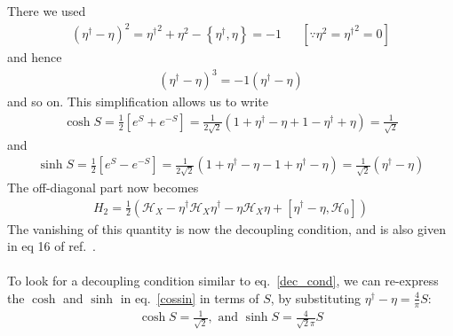\documentclass[twoside,11pt]{report}
\numberwithin{equation}{section}
\begin{document}
There we used
\begin{equation}\begin{aligned}
	\left(\eta^\dagger - \eta\right)^2 = {\eta^\dagger}^2 + \eta^2 - \left\{\eta^\dagger,\eta\right\} = -1 &&\left[\because\eta^2 = {\eta^\dagger}^2=0\right]
\end{aligned}\end{equation}
and hence
\begin{equation}\begin{aligned}
	\left(\eta^\dagger - \eta\right)^3 = -1\left(\eta^\dagger - \eta\right)
\end{aligned}\end{equation}
and so on. This simplification allows us to write
\begin{equation}\begin{aligned}
	\label{cossin}
	\cosh S = \frac{1}{2}\left[e^S + e^{-S}\right] = \frac{1}{2\sqrt 2}\left(1 + \eta^\dagger - \eta + 1 - \eta^\dagger + \eta\right) = \frac{1}{\sqrt 2}
\end{aligned}\end{equation}
and
\begin{equation}\begin{aligned}
	\sinh S = \frac{1}{2}\left[e^S - e^{-S}\right] = \frac{1}{2\sqrt 2}\left(1 + \eta^\dagger - \eta - 1 + \eta^\dagger - \eta\right) = \frac{1}{\sqrt 2}\left(\eta^\dagger - \eta\right)
\end{aligned}\end{equation}
The off-diagonal part now becomes
\begin{equation}\begin{aligned}
	H_2 = \frac{1}{2}\left(\mathcal{H}_X - \eta^\dagger \mathcal{H}_X \eta^\dagger - \eta \mathcal{H}_X \eta + \left[\eta^\dagger - \eta, \mathcal{H}_0\right]\right)
\end{aligned}\end{equation}
The vanishing of this quantity is now the decoupling condition, and is also given in eq 16 of ref.~\cite{holography1}.
\\\\To look for a decoupling condition similar to eq.~\ref{dec_cond}, we can re-express the \(\cosh\) and \(\sinh\) in eq.~\ref{cossin} in terms of \(S\), by substituting \(\eta^\dagger - \eta = \frac{4}{\pi}S\):
\begin{equation}\begin{aligned}
\cosh S = \frac{1}{\sqrt 2},\text{ and } \sinh S = \frac{4}{\sqrt 2 \pi}S
\end{aligned}\end{equation}
\end{document}
